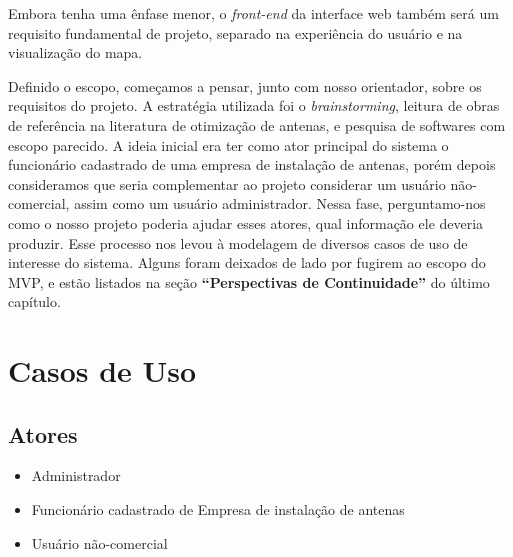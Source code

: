 \documentclass[]{politex}
\begin{document}
Embora tenha uma ênfase menor, o \textit{front-end} da interface web também será
um requisito fundamental de projeto, separado na experiência do usuário e na
visualização do mapa.

Definido o escopo, começamos a pensar, junto com nosso orientador, sobre os
requisitos do projeto. A estratégia utilizada foi o \textit{brainstorming}, leitura de
obras de referência na literatura de otimização de antenas, e pesquisa de softwares com escopo parecido.
A ideia inicial era ter como ator principal do sistema o funcionário cadastrado
de uma empresa de instalação de antenas, porém depois consideramos que seria
complementar ao projeto considerar um usuário não-comercial, assim
como um usuário administrador. Nessa fase, perguntamo-nos como o nosso projeto
poderia ajudar esses atores, qual informação ele deveria produzir. Esse processo
nos levou à modelagem de diversos casos de uso de interesse do sistema. Alguns
foram deixados de lado por fugirem ao escopo do MVP, e estão listados na seção
\textbf{``Perspectivas de Continuidade''} do último capítulo.

\section{Casos de Uso}

\newcommand{\usecase}[1]{\refstepcounter{usecasecounter}\label{usecase:#1}\arabic{usecasecounter}}

\subsection{Atores}
\begin{itemize}
\item Administrador
\item Funcionário cadastrado de Empresa de instalação de antenas
\item Usuário não-comercial
\end{itemize}
\end{document}
